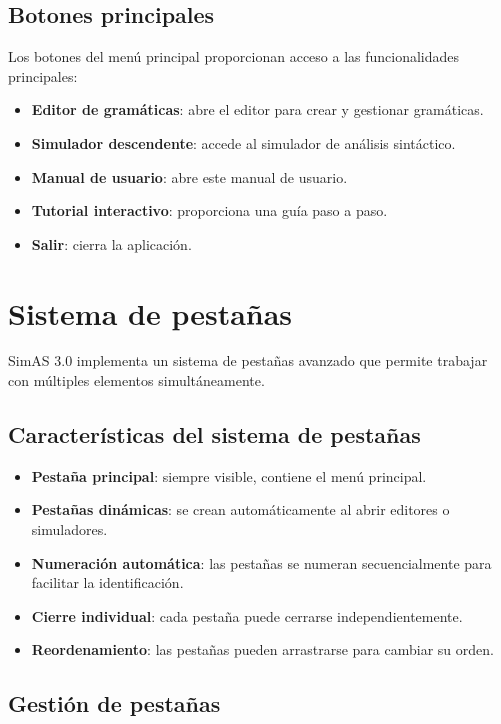 \subsection{Botones principales}

Los botones del menú principal proporcionan acceso a las funcionalidades principales:

\begin{itemize}
    \item \textbf{Editor de gramáticas}: abre el editor para crear y gestionar gramáticas.
    \item \textbf{Simulador descendente}: accede al simulador de análisis sintáctico.
    \item \textbf{Manual de usuario}: abre este manual de usuario.
    \item \textbf{Tutorial interactivo}: proporciona una guía paso a paso.
    \item \textbf{Salir}: cierra la aplicación.
\end{itemize}

\section{Sistema de pestañas}

SimAS 3.0 implementa un sistema de pestañas avanzado que permite trabajar con múltiples elementos simultáneamente.

\subsection{Características del sistema de pestañas}

\begin{itemize}
    \item \textbf{Pestaña principal}: siempre visible, contiene el menú principal.
    \item \textbf{Pestañas dinámicas}: se crean automáticamente al abrir editores o simuladores.
    \item \textbf{Numeración automática}: las pestañas se numeran secuencialmente para facilitar la identificación.
    \item \textbf{Cierre individual}: cada pestaña puede cerrarse independientemente.
    \item \textbf{Reordenamiento}: las pestañas pueden arrastrarse para cambiar su orden.
\end{itemize}

\subsection{Gestión de pestañas}

